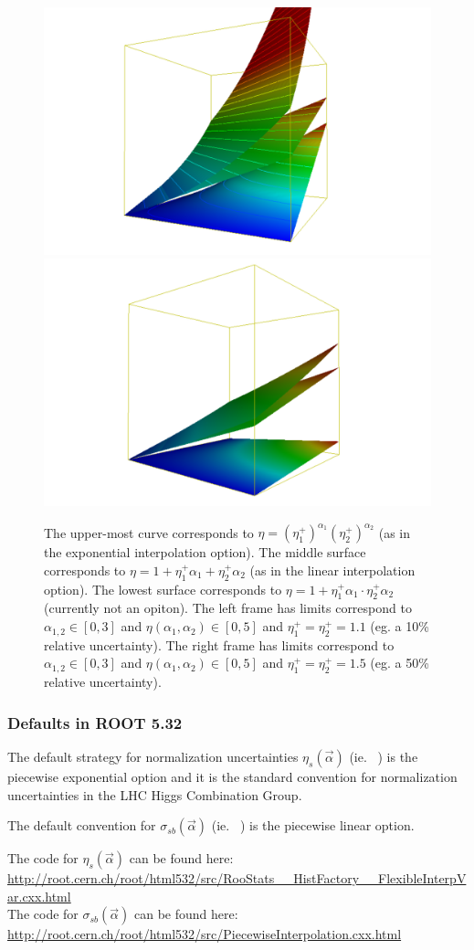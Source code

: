 \begin{figure}[h]
\begin{center}
\includegraphics[width=.3\textwidth]{figures/histfactory/Interpolation2d}\hspace{.2\textwidth}\includegraphics[width=.3\textwidth]{figures/histfactory/Interpolation2d_10}
\caption{The upper-most curve corresponds to $\eta = (\eta^+_1)^{\alpha_1} (\eta^+_2)^{\alpha_2}$ (as in the exponential interpolation option).   The middle surface corresponds to $\eta = 1+\eta^+_1\alpha_1 + \eta^+_2\alpha_2$ (as in the linear interpolation option).  The lowest surface corresponds to $\eta = 1+ \eta^+_1 \alpha_1 \cdot \eta^+_2 \alpha_2$ (currently not an opiton).  The left frame has limits correspond to $\alpha_{1,2} \in [0,3]$ and $\eta(\alpha_1,\alpha_2)\in[0,5]$ and $\eta^+_1=\eta^+_2=1.1$ (eg. a 10\% relative uncertainty). The right frame has limits correspond to $\alpha_{1,2} \in [0,3]$ and $\eta(\alpha_1,\alpha_2)\in[0,5]$ and $\eta^+_1=\eta^+_2=1.5$ (eg. a 50\% relative uncertainty).  }
\label{fig:interp2d}
\end{center}
\end{figure}

\subsubsection{Defaults in ROOT 5.32}

The default strategy for normalization uncertainties $\eta_{s}(\vec{\alpha})$ (ie. \OS\ ) is the piecewise exponential option and it is the standard convention for normalization uncertainties in the LHC Higgs Combination Group.

The default convention for $\sigma_{sb}(\vec{\alpha})$ (ie. \HS\ ) is the piecewise linear option.

The code for $\eta_s(\vec\alpha)$ can be found here:\\
{\tiny \url{http://root.cern.ch/root/html532/src/RooStats__HistFactory__FlexibleInterpVar.cxx.html}}\\
The code for $\sigma_{sb}(\vec\alpha)$ can be found here:\\
{\tiny \url{http://root.cern.ch/root/html532/src/PiecewiseInterpolation.cxx.html}}


